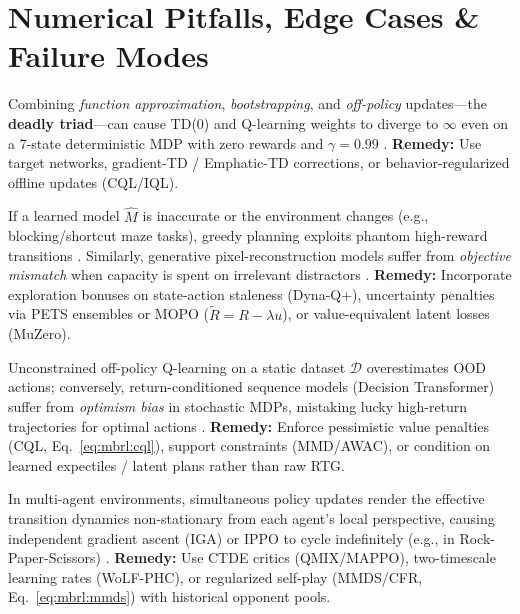 \documentclass[../../../../master.tex]{subfiles}
\begin{document}
\section{Numerical Pitfalls, Edge Cases \& Failure Modes}
\label{sec:mbrl:pitfalls}

\begin{pitfall}
Combining \emph{function approximation}, \emph{bootstrapping}, and \emph{off-policy} updates---the \textbf{deadly triad}---can cause TD(0) and Q-learning weights to diverge to $\infty$ even on a 7-state deterministic MDP with zero rewards and $\gamma = 0.99$ .
\textbf{Remedy:} Use target networks, gradient-TD / Emphatic-TD corrections, or behavior-regularized offline updates (CQL/IQL).
\end{pitfall}

\begin{pitfall}
If a learned model $\hat{M}$ is inaccurate or the environment changes (e.g., blocking/shortcut maze tasks), greedy planning exploits phantom high-reward transitions . Similarly, generative pixel-reconstruction models suffer from \emph{objective mismatch} when capacity is spent on irrelevant distractors .
\textbf{Remedy:} Incorporate exploration bonuses on state-action staleness (Dyna-Q+), uncertainty penalties via PETS ensembles or MOPO ($\tilde{R} = R - \lambda u$), or value-equivalent latent losses (MuZero).
\end{pitfall}

\begin{pitfall}
Unconstrained off-policy Q-learning on a static dataset $\mathcal{D}$ overestimates OOD actions; conversely, return-conditioned sequence models (Decision Transformer) suffer from \emph{optimism bias} in stochastic MDPs, mistaking lucky high-return trajectories for optimal actions .
\textbf{Remedy:} Enforce pessimistic value penalties (CQL, Eq.~\eqref{eq:mbrl:cql}), support constraints (MMD/AWAC), or condition on learned expectiles / latent plans rather than raw RTG.
\end{pitfall}

\begin{pitfall}
In multi-agent environments, simultaneous policy updates render the effective transition dynamics non-stationary from each agent's local perspective, causing independent gradient ascent (IGA) or IPPO to cycle indefinitely (e.g., in Rock-Paper-Scissors) .
\textbf{Remedy:} Use CTDE critics (QMIX/MAPPO), two-timescale learning rates (WoLF-PHC), or regularized self-play (MMDS/CFR, Eq.~\eqref{eq:mbrl:mmds}) with historical opponent pools.
\end{pitfall}
\end{document}

